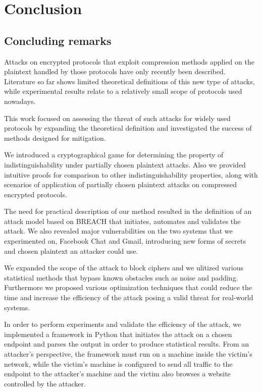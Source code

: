 \chapter{Conclusion}\label{conclusion}

\section{Concluding remarks}

Attacks on encrypted protocols that exploit compression methods applied on the
plaintext handled by those protocols have only recently been described.
Literature so far shows limited theoretical definitions of this new type of
attacks, while experimental results relate to a relatively small scope of
protocols used nowadays.

This work focused on assessing the threat of such attacks for widely used
protocols by expanding the theoretical definition and investigated the
success of methods designed for mitigation.

We introduced a cryptographical game for determining the property of
indistinguishability under partially chosen plaintext attacks. Also we provided
intuitive proofs for comparison to other indistinguishability properties, along
with scenarios of application of partially chosen plaintext attacks on
compressed encrypted protocols.

The need for practical description of our method resulted in the definition of
an attack model based on BREACH that initiates, automates and validates the
attack. We also revealed major vulnerabilities on the two systems that we
experimented on, Facebook Chat and Gmail, introducing new forms of secrets and
chosen plaintext an attacker could use.

We expanded the scope of the attack to block ciphers and we ulitized various
statistical methods that bypass known obstacles such as noise and padding.
Furthermore we proposed various optimization techniques that could reduce the
time and increase the efficiency of the attack posing a valid threat for
real-world systems.

In order to perform experiments and validate the efficiency of the attack, we
implemented a framework in Python that initiates the attack on a chosen
endpoint and parses the output in order to produce statistical results. From an
attacker's perspective, the framework must run on a machine inside the victim's
network, while the victim's machine is configured to send all traffic to the
endpoint to the attacker's machine and the victim also browses a website
controlled by the attacker.

